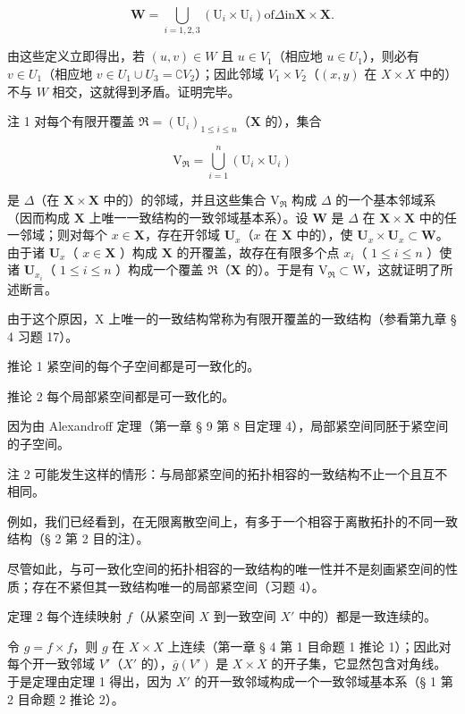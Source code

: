 \[
\mathbf {W} = \bigcup_ {i = 1, 2, 3} (\mathrm{U} _ {i} \times \mathrm{U} _ {i}) \text {of} \Delta \text {in} \mathbf {X} \times \mathbf {X}.
\]

由这些定义立即得出，若 \((u, v) \in W\) 且 \(u \in V_1\)（相应地 \(u \in U_1\)），则必有 \(v \in U_1\)（相应地 \(v \in U_1 \cup U_3 = \complement V_2\)）；因此邻域 \(V_1 \times V_2\)（\((x, y)\) 在 \(X \times X\) 中的）不与 \(W\) 相交，这就得到矛盾。证明完毕。

注 1 对每个有限开覆盖 \(\Re = (\mathrm{U}_i)_{1\leqslant i\leqslant n}\)（\(\mathbf{X}\) 的），集合

\[
\mathrm{V} _ {\Re} = \bigcup_ {i = 1} ^ {n} \left(\mathrm{U} _ {i} \times \mathrm{U} _ {i}\right)
\]

是 \(\Delta\)（在 \(\mathbf{X} \times \mathbf{X}\) 中的）的邻域，并且这些集合 \(\mathrm{V}_{\Re}\) 构成 \(\Delta\) 的一个基本邻域系（因而构成 \(\mathbf{X}\) 上唯一一致结构的一致邻域基本系）。设 \(\mathbf{W}\) 是 \(\Delta\) 在 \(\mathbf{X} \times \mathbf{X}\) 中的任一邻域；则对每个 \(x \in \mathbf{X}\)，存在开邻域 \(\mathbf{U}_x\)（\(x\) 在 \(\mathbf{X}\) 中的），使 \(\mathbf{U}_x \times \mathbf{U}_x \subset \mathbf{W}\)。由于诸 \(\mathbf{U}_x\)（ \(x \in \mathbf{X}\) ）构成 \(\mathbf{X}\) 的开覆盖，故存在有限多个点 \(x_i\)（ \(1 \leqslant i \leqslant n\) ）使诸 \(\mathbf{U}_{x_i}\)（ \(1 \leqslant i \leqslant n\) ）构成一个覆盖 \(\Re\)（\(\mathbf{X}\) 的）。于是有 \(\mathrm{V}_{\Re} \subset \mathrm{W}\)，这就证明了所述断言。

由于这个原因，X 上唯一的一致结构常称为有限开覆盖的一致结构（参看第九章 § 4 习题 17）。

推论 1 紧空间的每个子空间都是可一致化的。

推论 2 每个局部紧空间都是可一致化的。

因为由 Alexandroff 定理（第一章 § 9 第 8 目定理 4），局部紧空间同胚于紧空间的子空间。

注 2 可能发生这样的情形：与局部紧空间的拓扑相容的一致结构不止一个且互不相同。

例如，我们已经看到，在无限离散空间上，有多于一个相容于离散拓扑的不同一致结构（§ 2 第 2 目的注）。

尽管如此，与可一致化空间的拓扑相容的一致结构的唯一性并不是刻画紧空间的性质；存在不紧但其一致结构唯一的局部紧空间（习题 4）。

定理 2 每个连续映射 \(f\)（从紧空间 \(X\) 到一致空间 \(X'\) 中的）都是一致连续的。

令 \(g = f \times f\)，则 \(g\) 在 \(X \times X\) 上连续（第一章 § 4 第 1 目命题 1 推论 1）；因此对每个开一致邻域 \(V'\)（\(X'\) 的），\(\overline{g}(V')\) 是 \(X \times X\) 的开子集，它显然包含对角线。于是定理由定理 1 得出，因为 \(X'\) 的开一致邻域构成一个一致邻域基本系（§ 1 第 2 目命题 2 推论 2）。

